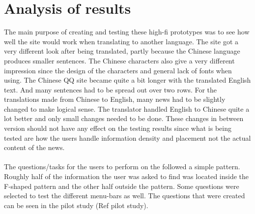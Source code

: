 \section{Analysis of results}
The main purpose of creating and testing these high-fi prototypes was to see how well the site would work when translating to another language. The site got a very different look after being translated, partly because the Chinese language produces smaller sentences. The Chinese characters also give a very different impression since the design of the characters and general lack of fonts when using. The Chinese QQ site became quite a bit longer with the translated English text. And many sentences had to be spread out over two rows. For the translations made from Chinese to English, many news had to be slightly changed to make logical sense. The translator handled English to Chinese quite a lot better and only small changes needed to be done. These changes in between version should not have any effect on the testing results since what is being tested are how the users handle information density and placement not the actual content of the news.
\\\\
 The questions/tasks for the users to perform on the followed a simple pattern. Roughly half of the information the user was asked to find was located inside the F-shaped pattern and the other half outside the pattern. Some questions were selected to test the different menu-bars as well. The questions that were created can be seen in the pilot study (Ref pilot study).





